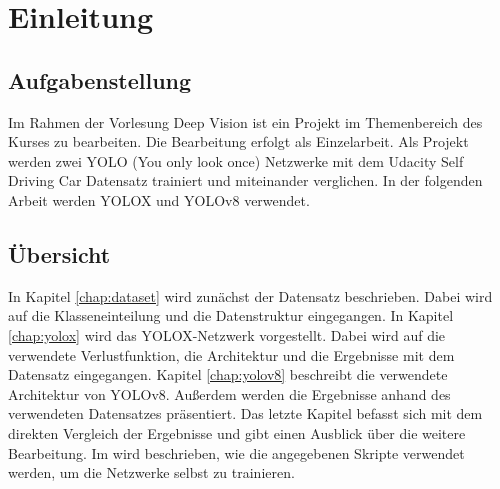 \chapter{Einleitung}

\section{Aufgabenstellung}
Im Rahmen der Vorlesung Deep Vision ist ein Projekt im Themenbereich des Kurses zu bearbeiten. Die Bearbeitung erfolgt als Einzelarbeit. Als Projekt werden zwei YOLO (You only look once) Netzwerke mit dem Udacity Self Driving Car Datensatz trainiert und miteinander verglichen. In der folgenden Arbeit werden YOLOX und YOLOv8 verwendet.


\section{Übersicht}
In Kapitel \ref{chap:dataset} wird zunächst der Datensatz beschrieben. Dabei wird auf die Klasseneinteilung und die Datenstruktur eingegangen. In Kapitel \ref{chap:yolox} wird das YOLOX-Netzwerk vorgestellt. Dabei wird auf die verwendete Verlustfunktion, die Architektur und die Ergebnisse mit dem Datensatz eingegangen. Kapitel \ref{chap:yolov8} beschreibt die verwendete Architektur von YOLOv8. Außerdem werden die Ergebnisse anhand des verwendeten Datensatzes präsentiert. Das letzte Kapitel befasst sich mit dem direkten Vergleich der Ergebnisse und gibt einen Ausblick über die weitere Bearbeitung. Im  wird beschrieben, wie die angegebenen Skripte verwendet werden, um die Netzwerke selbst zu trainieren.


